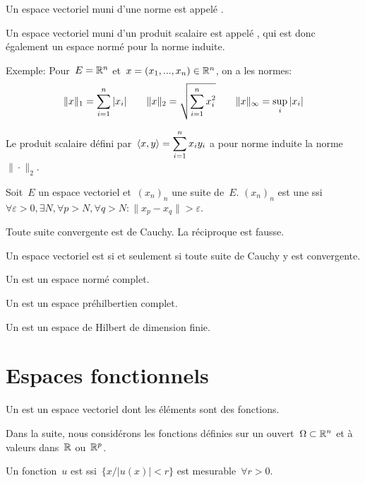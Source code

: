 Un espace vectoriel muni d'une norme est appelé .

Un espace vectoriel muni d'un produit scalaire est appelé ,  qui est donc également un espace normé pour la norme induite.

\medskip
Exemple:
Pour~$E = \mathbb R^n$ et~$x = (x_1, ..., x_n)\in\mathbb R^n$, on a les normes:
\[
\|x\|_1=\displaystyle\sum_{i=1}^n|x_i| \qquad
\|x\|_2= \sqrt{\displaystyle\sum_{i=1}^nx_i^2} \qquad
\|x\|_\infty=\sup_i|x_i|
\]

Le produit scalaire défini par~$\langle x,y\rangle=\displaystyle\sum_{i=1}^nx_iy_i$ a pour norme induite la norme~$\|\cdot\|_2$.

\medskip
Soit~$E$ un espace vectoriel et~$(x_n)_n$ une suite de~$E$. 
$(x_n)_n$ est une  ssi 
$\forall\varepsilon>0, \exists N, \forall p> N, \forall q> N: \|x_p-x_q\|>\varepsilon$.

Toute suite convergente est de Cauchy. La réciproque est fausse.

Un espace vectoriel est  si et seulement si toute suite de Cauchy y est convergente.

Un  est un espace normé complet.

Un  est un espace préhilbertien complet.

Un  est un espace de Hilbert de dimension finie.






\medskip
\section*{Espaces fonctionnels}

Un  est un espace vectoriel dont les éléments sont des fonctions.

Dans la suite, nous considérons les fonctions définies sur un ouvert~$\Omega\subset\mathbb R^n$ et à valeurs dans~$\mathbb R$ ou~$\mathbb R^p$.

Un fonction~$u$ est  ssi~$\{x/ |u(x)|<r\}$ est mesurable~$\forall r>0$.


